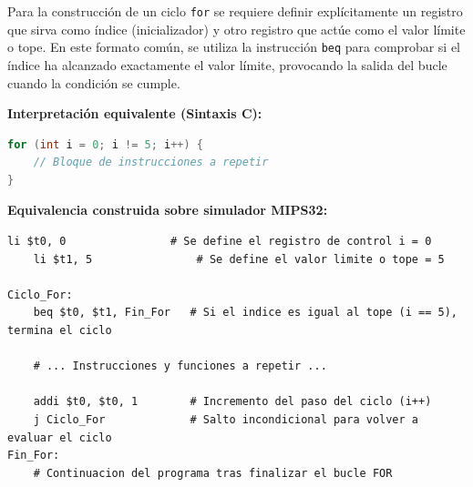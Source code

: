 \documentclass[12pt,a4paper]{article}
\begin{document}
\vspace{0.3cm}
\begin{tcolorbox}[colback=colorCiclos!5, colframe=colorCiclos, title=Ciclo Básico FOR, fonttitle=\bfseries]
Para la construcción de un ciclo \texttt{for} se requiere definir explícitamente un registro que sirva como índice (inicializador) y otro registro que actúe como el valor límite o tope. En este formato común, se utiliza la instrucción \texttt{beq} para comprobar si el índice ha alcanzado exactamente el valor límite, provocando la salida del bucle cuando la condición se cumple.

\textbf{Interpretación equivalente (Sintaxis C):}
\begin{lstlisting}[language=C, numbers=none, commentstyle=\color{gray}\itshape]
for (int i = 0; i != 5; i++) {
    // Bloque de instrucciones a repetir
}
\end{lstlisting}

\textbf{Equivalencia construida sobre simulador MIPS32:}
\begin{lstlisting}[numbers=none]
    li $t0, 0                # Se define el registro de control i = 0
    li $t1, 5                # Se define el valor limite o tope = 5 

Ciclo_For:
    beq $t0, $t1, Fin_For   # Si el indice es igual al tope (i == 5), termina el ciclo
    
    # ... Instrucciones y funciones a repetir ...
    
    addi $t0, $t0, 1        # Incremento del paso del ciclo (i++)
    j Ciclo_For             # Salto incondicional para volver a evaluar el ciclo
Fin_For:
    # Continuacion del programa tras finalizar el bucle FOR
\end{lstlisting}
\end{tcolorbox}
\end{document}
